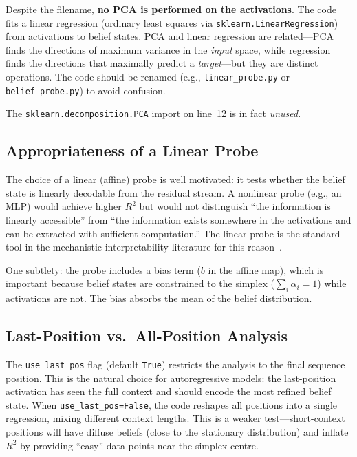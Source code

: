 \documentclass[11pt]{article}
\newcommand{\code}[1]{\texttt{#1}}
\newcommand{\file}[1]{\texttt{#1}}
\begin{document}
Despite the filename, \textbf{no PCA is performed on the activations}.  The code fits a linear regression (ordinary least squares via \code{sklearn.LinearRegression}) from activations to belief states.  PCA and linear regression are related---PCA finds the directions of maximum variance in the \emph{input} space, while regression finds the directions that maximally predict a \emph{target}---but they are distinct operations.  The code should be renamed (e.g., \file{linear\_probe.py} or \file{belief\_probe.py}) to avoid confusion.

The \code{sklearn.decomposition.PCA} import on line~12 is in fact \emph{unused}.

\subsection{Appropriateness of a Linear Probe}

The choice of a linear (affine) probe is well motivated: it tests whether the belief state is linearly decodable from the residual stream.  A nonlinear probe (e.g., an MLP) would achieve higher $R^2$ but would not distinguish ``the information is linearly accessible'' from ``the information exists somewhere in the activations and can be extracted with sufficient computation.''  The linear probe is the standard tool in the mechanistic-interpretability literature for this reason~\cite{shai2024transformers, alain2016understanding}.

One subtlety: the probe includes a bias term ($b$ in the affine map), which is important because belief states are constrained to the simplex ($\sum_i \alpha_i = 1$) while activations are not.  The bias absorbs the mean of the belief distribution.

\subsection{Last-Position vs.\ All-Position Analysis}

The \code{use\_last\_pos} flag (default \code{True}) restricts the analysis to the final sequence position.  This is the natural choice for autoregressive models: the last-position activation has seen the full context and should encode the most refined belief state.  When \code{use\_last\_pos=False}, the code reshapes all positions into a single regression, mixing different context lengths.  This is a weaker test---short-context positions will have diffuse beliefs (close to the stationary distribution) and inflate $R^2$ by providing ``easy'' data points near the simplex centre.
\end{document}
